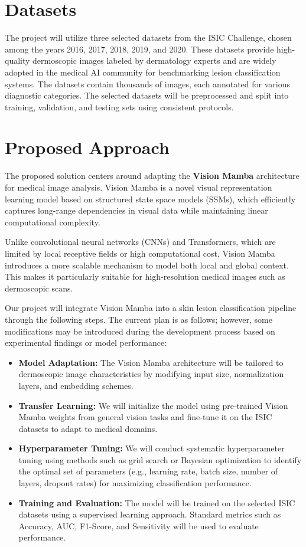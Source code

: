 \documentclass[11pt]{article}
\begin{document}
\section*{Datasets}
The project will utilize three selected datasets from the ISIC Challenge, chosen among the years 2016, 2017, 2018, 2019, and 2020. These datasets provide high-quality dermoscopic images labeled by dermatology experts and are widely adopted in the medical AI community for benchmarking lesion classification systems. The datasets contain thousands of images, each annotated for various diagnostic categories. The selected datasets will be preprocessed and split into training, validation, and testing sets using consistent protocols.

\section*{Proposed Approach}
The proposed solution centers around adapting the \textbf{Vision Mamba} architecture for medical image analysis. Vision Mamba is a novel visual representation learning model based on structured state space models (SSMs), which efficiently captures long-range dependencies in visual data while maintaining linear computational complexity.

Unlike convolutional neural networks (CNNs) and Transformers, which are limited by local receptive fields or high computational cost, Vision Mamba introduces a more scalable mechanism to model both local and global context. This makes it particularly suitable for high-resolution medical images such as dermoscopic scans.

Our project will integrate Vision Mamba into a skin lesion classification pipeline through the following steps. The current plan is as follows; however, some modifications may be introduced during the development process based on experimental findings or model performance:

\begin{itemize}
    \item \textbf{Model Adaptation:} The Vision Mamba architecture will be tailored to dermoscopic image characteristics by modifying input size, normalization layers, and embedding schemes.
    
    \item \textbf{Transfer Learning:} We will initialize the model using pre-trained Vision Mamba weights from general vision tasks and fine-tune it on the ISIC datasets to adapt to medical domains.

    \item \textbf{Hyperparameter Tuning:} We will conduct systematic hyperparameter tuning using methods such as grid search or Bayesian optimization to identify the optimal set of parameters (e.g., learning rate, batch size, number of layers, dropout rates) for maximizing classification performance.

    \item \textbf{Training and Evaluation:} The model will be trained on the selected ISIC datasets using a supervised learning approach. Standard metrics such as Accuracy, AUC, F1-Score, and Sensitivity will be used to evaluate performance.
\end{itemize}
\end{document}
